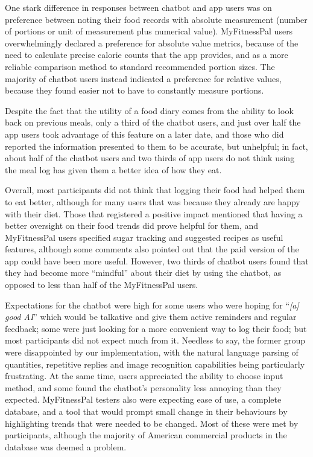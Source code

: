 One stark difference in responses between chatbot and app users was on preference between noting their food records with absolute measurement (number of portions or unit of measurement plus numerical value). MyFitnessPal users overwhelmingly declared a preference for absolute value metrics, because of the need to calculate precise calorie counts that the app provides, and as a more reliable comparison method to standard recommended portion sizes. The majority of chatbot users instead indicated a preference for relative values, because they found easier not to have to constantly measure portions. 

Despite the fact that the utility of a food diary comes from the ability to look back on previous meals, only a third of the chatbot users, and just over half the app users took advantage of this feature on a later date, and those who did reported the information presented to them to be accurate, but unhelpful; in fact, about half of the chatbot users and two thirds of app users do not think using the meal log has given them a better idea of how they eat. 

Overall, most participants did not think that logging their food had helped them to eat better, although for many users that was because they already are happy with their diet. Those that registered a positive impact mentioned that having a better oversight on their food trends did prove helpful for them, and MyFitnessPal users specified sugar tracking and suggested recipes as useful features, although some comments also pointed out that the paid version of the app could have been more useful. However, two thirds of chatbot users found that they had become more ``mindful'' about their diet by using the chatbot, as opposed to less than half of the MyFitnessPal users. 

Expectations for the chatbot were high for some users who were hoping for ``\textit{[a] good AI}'' which would be talkative and give them active reminders and regular feedback; some were just looking for a more convenient way to log their food; but most participants did not expect much from it. Needless to say, the former group were disappointed by our implementation, with the natural language parsing of quantities, repetitive replies and image recognition capabilities being particularly frustrating. At the same time, users appreciated the ability to choose input method, and some found the chatbot's personality less annoying than they expected. MyFitnessPal testers also were expecting ease of use, a complete database, and a tool that would prompt small change in their behaviours by highlighting trends that were needed to be changed. Most of these were met by participants, although the majority of American commercial products in the database was deemed a problem. 

